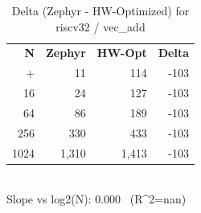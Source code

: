 \begin{table}[tb]
    \centering
    \caption{Delta (Zephyr - HW-Optimized) for riscv32 / vec_add}
    \label{tab:delta_riscv32_vec_add}
    \scriptsize
    \begin{tabular}{r r r r}
        \hline
        \textbf{N} & \textbf{Zephyr} & \textbf{HW-Opt} & \textbf{Delta} \\\n+        \hline
        4 & 11 & 114 & -103\\
        16 & 24 & 127 & -103\\
        64 & 86 & 189 & -103\\
        256 & 330 & 433 & -103\\
        1024 & 1,310 & 1,413 & -103\\
        \hline
    \end{tabular}
    \vspace{2mm}\\\n    Slope vs log2(N): 0.000 \ (R^2=nan)\n\end{table}
